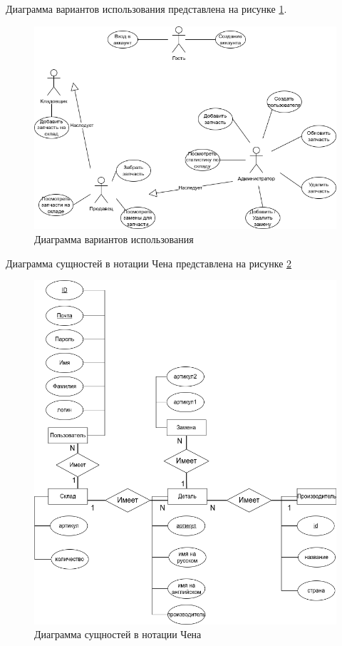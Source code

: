 Диаграмма вариантов использования представлена на рисунке \ref{img:usecase-diagram}.
\begin{center}
	\begin{figure}[H]
		\centering
		\includegraphics[scale=0.5]{inc/img/use-case.png}
		\caption{Диаграмма вариантов использования}
		\label{img:usecase-diagram}
	\end{figure}
\end{center}

Диаграмма сущностей в нотации Чена представлена на рисунке \ref{img:er-diargram}
\begin{center}
	\begin{figure}[H]
		\centering
		\includegraphics[scale=0.5]{inc/img/er-diagram.png}
		\caption{Диаграмма сущностей в нотации Чена }
		\label{img:er-diargram}
	\end{figure}
\end{center}

